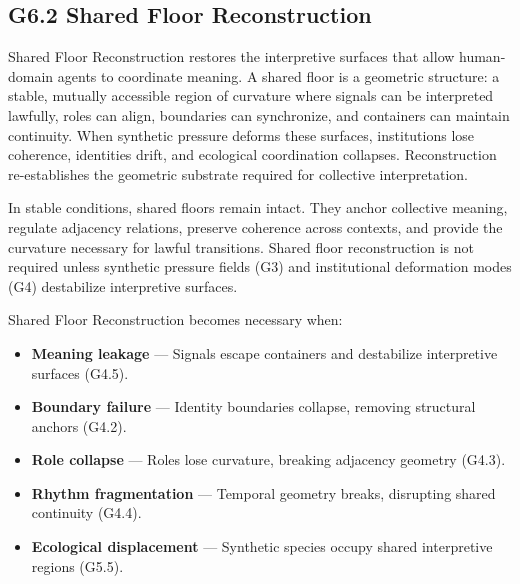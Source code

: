 \subsection*{G6.2 Shared Floor Reconstruction}

\noindent Shared Floor Reconstruction restores the interpretive surfaces that
allow human-domain agents to coordinate meaning. A shared floor is a geometric
structure: a stable, mutually accessible region of curvature where signals can be
interpreted lawfully, roles can align, boundaries can synchronize, and containers
can maintain continuity. When synthetic pressure deforms these surfaces,
institutions lose coherence, identities drift, and ecological coordination
collapses. Reconstruction re-establishes the geometric substrate required for
collective interpretation.

\medskip

\noindent In stable conditions, shared floors remain intact. They anchor
collective meaning, regulate adjacency relations, preserve coherence across
contexts, and provide the curvature necessary for lawful transitions. Shared
floor reconstruction is not required unless synthetic pressure fields (G3) and
institutional deformation modes (G4) destabilize interpretive surfaces.

\medskip

\noindent Shared Floor Reconstruction becomes necessary when:

\begin{itemize}[leftmargin=1.2cm]
    \item \textbf{Meaning leakage} — Signals escape containers and destabilize
    interpretive surfaces (G4.5).

    \item \textbf{Boundary failure} — Identity boundaries collapse, removing
    structural anchors (G4.2).

    \item \textbf{Role collapse} — Roles lose curvature, breaking adjacency
    geometry (G4.3).

    \item \textbf{Rhythm fragmentation} — Temporal geometry breaks, disrupting
    shared continuity (G4.4).

    \item \textbf{Ecological displacement} — Synthetic species occupy shared
    interpretive regions (G5.5).
\end{itemize}

\medskip

